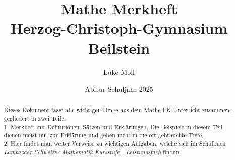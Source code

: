 \documentclass[12pt,a4paper]{report}
\title{Mathe Merkheft
{\\\Large Herzog-Christoph-Gymnasium Beilstein}}
\author{Luke Moll}
\date{Abitur Schuljahr 2025}
\begin{document}
\newtheorem{satz}{Satz}
\newtheorem{definition}{Definition}
\maketitle
\begin{abstract}
    Dieses Dokument fasst alle wichtigen Dinge aus dem Mathe-LK-Unterricht zusammen, gegliedert in zwei Teile: \\ 1. Merkheft mit Definitionen, Sätzen und Erklärungen. Die Beispiele in diesem Teil dienen meist nur zur Erklärung und gehen nicht in die oft gebrauchte Tiefe. \\ 2. Hier findet man weiter Verweise zu wichtigen Aufgaben, welche sich im Schulbuch \textit{Lambacher Schweizer Mathematik Kursstufe - Leistungsfach} finden.
\end{abstract}
\tableofcontents
\vspace{2cm} %







\end{document}
